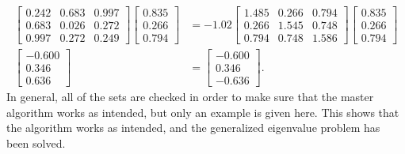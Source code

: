 \documentclass[12pt]{article}
\begin{document}
\begin{align*}
    \begin{bmatrix}
    0.242 &0.683 &0.997\\
    0.683 &0.026 &0.272\\
    0.997 &0.272 &0.249
    \end{bmatrix} \begin{bmatrix}
    0.835\\
    0.266\\
    0.794
    \end{bmatrix} &= -1.02 \begin{bmatrix}
    1.485 &0.266 &0.794\\
    0.266 &1.545 &0.748\\
    0.794 &0.748 &1.586
    \end{bmatrix} \begin{bmatrix}
    0.835\\
    0.266\\
    0.794
    \end{bmatrix}
    \\[2.5mm]
    \begin{bmatrix}
    -0.600\\
    0.346\\
    0.636
    \end{bmatrix} &= \begin{bmatrix}
    -0.600\\
    0.346\\
    -0.636
    \end{bmatrix}.
\end{align*}
In general, all of the sets are checked in order to make sure that the master algorithm works as intended, but only an example is given here. This shows that the algorithm works as intended, and the generalized eigenvalue problem has been solved.

\newpage
\printbibliography
\end{document}
